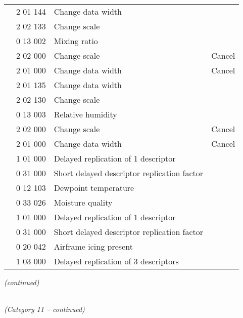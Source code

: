 \begin{longtable}[]{@{}llll@{}}
& 2 01 144 & Change data width &\tabularnewline
& 2 02 133 & Change scale &\tabularnewline
& 0 13 002 & Mixing ratio &\tabularnewline
& 2 02 000 & Change scale & Cancel\tabularnewline
& 2 01 000 & Change data width & Cancel\tabularnewline
& 2 01 135 & Change data width &\tabularnewline
& 2 02 130 & Change scale &\tabularnewline
& 0 13 003 & Relative humidity &\tabularnewline
& 2 02 000 & Change scale & Cancel\tabularnewline
& 2 01 000 & Change data width & Cancel\tabularnewline
& 1 01 000 & Delayed replication of 1 descriptor &\tabularnewline
& 0 31 000 & Short delayed descriptor replication factor &\tabularnewline
& 0 12 103 & Dewpoint temperature &\tabularnewline
& 0 33 026 & Moisture quality &\tabularnewline
& 1 01 000 & Delayed replication of 1 descriptor &\tabularnewline
& 0 31 000 & Short delayed descriptor replication factor &\tabularnewline
& 0 20 042 & Airframe icing present &\tabularnewline
& 1 03 000 & Delayed replication of 3 descriptors &\tabularnewline
\bottomrule
\end{longtable}

\emph{(continued)}

\emph{\\
(Category 11 -- continued)}

